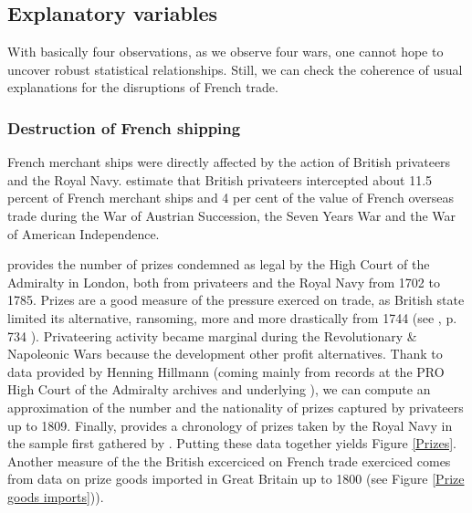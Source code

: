 \documentclass[12pt,a4paper,notitlepage,english]{article}
\begin{document}
\subsection{Explanatory variables}

With basically four observations, as we observe four wars, one cannot hope to uncover robust statistical relationships. Still, we can check the coherence of usual explanations for the disruptions of French trade.
\subsubsection{Destruction of French shipping}\label{section:DestructionofFrenchshipping}
French merchant ships were directly affected by the action of British privateers and the Royal Navy. 
\cite{Hillmann2011} estimate that British privateers intercepted about 11.5 percent of French merchant ships and 4 per cent of the value of French overseas trade during the War of Austrian Succession, the Seven Years War and the War of American Independence. 

\cite{Starkey1990} provides the number of prizes condemned as legal by the High Court of the Admiralty in London, both from privateers and the Royal Navy from 1702 to 1785. 
Prizes are a good measure of the pressure exerced on trade, as British state limited its alternative, ransoming, more and more drastically from 1744 (see \cite{Hillmann2011}, p. 734 ).
Privateering activity became marginal during the Revolutionary \& Napoleonic Wars because the development other profit alternatives.
Thank to data provided by Henning Hillmann (coming mainly from records at the PRO High Court of the Admiralty archives and underlying \cite{Hillmann2011}), we can compute an approximation of the number and the nationality of prizes captured by privateers up to 1809. Finally, \cite{Benjamin2009} provides a chronology of prizes taken by the Royal Navy in the sample first gathered by \cite{Hill1998}. Putting these data together yields Figure \ref{Prizes}.
Another measure of the the British excerciced on French trade exerciced comes from data on prize goods imported in Great Britain up to 1800 (see Figure \ref{Prize goods imports})).
\end{document}

